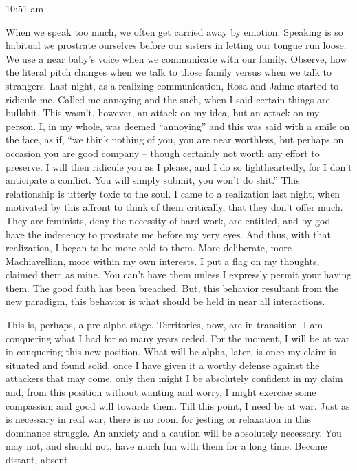 10:51 am

When we speak too much, we often get carried away by emotion. Speaking
is so habitual we prostrate ourselves before our sisters in letting our
tongue run loose. We use a near baby's voice when we communicate with
our family. Observe, how the literal pitch changes when we talk to those
family versus when we talk to strangers. Last night, as a realizing
communication, Rosa and Jaime started to ridicule me. Called me annoying
and the such, when I said certain things are bullshit. This wasn't,
however, an attack on my idea, but an attack on my person. I, in my
whole, was deemed ``annoying'' and this was said with a smile on the
face, as if, ``we think nothing of you, you are near worthless, but
perhaps on occasion you are good company -- though certainly not worth
any effort to preserve. I will then ridicule you as I please, and I do
so lightheartedly, for I don't anticipate a conflict. You will simply
submit, you won't do shit.'' This relationship is utterly toxic to the
soul. I came to a realization last night, when motivated by this affront
to think of them critically, that they don't offer much. They are
feminists, deny the necessity of hard work, are entitled, and by god
have the indecency to prostrate me before my very eyes. And thus, with
that realization, I began to be more cold to them. More deliberate, more
Machiavellian, more within my own interests. I put a flag on my
thoughts, claimed them as mine. You can't have them unless I expressly
permit your having them. The good faith has been breached. But, this
behavior resultant from the new paradigm, this behavior is what should
be held in near all interactions.

This is, perhaps, a pre alpha stage. Territories, now, are in
transition. I am conquering what I had for so many years ceded. For the
moment, I will be at war in conquering this new position. What will be
alpha, later, is once my claim is situated and found solid, once I have
given it a worthy defense against the attackers that may come, only then
might I be absolutely confident in my claim and, from this position
without wanting and worry, I might exercise some compassion and good
will towards them. Till this point, I need be at war. Just as is
necessary in real war, there is no room for jesting or relaxation in
this dominance struggle. An anxiety and a caution will be absolutely
necessary. You may not, and should not, have much fun with them for a
long time. Become distant, absent.

